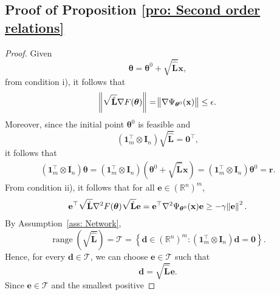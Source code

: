 \documentclass{siamart251216}
\begin{document}
\subsection{Proof of Proposition \ref{pro: Second order relations}}
\begin{proof}
    Given
    \[
        \boldsymbol{\theta}
        =
        \boldsymbol{\theta}^{0}
        +
        \sqrt{\hat{\mathbf{L}}}\mathbf{x},
    \]
    from condition i), it follows that
    \begin{gather*}
        \norm{
        \sqrt{\hat{\mathbf{L}}}
        \nabla F(\boldsymbol{\theta})
        }
        =
        \norm{
        \nabla
        \Psi_{\boldsymbol{\theta}^{0}}(\mathbf{x})
        }
        \le \epsilon.
    \end{gather*}
    Moreover, since the initial point
    $\boldsymbol{\theta}^{0}$ is feasible and
    \[
        (\bm{1}_{m}^{\top}\otimes\mathbf{I}_{n})
        \sqrt{\hat{\mathbf{L}}}
        =
        \bm{0}^{\top},
    \]
    it follows that
    \begin{gather*}
        (\bm{1}_{m}^{\top}\otimes\mathbf{I}_{n})
        \boldsymbol{\theta}
        =
        (\bm{1}_{m}^{\top}\otimes\mathbf{I}_{n})
        \left(
        \boldsymbol{\theta}^{0}
        +
        \sqrt{\hat{\mathbf{L}}}\mathbf{x}
        \right) =
        (\bm{1}_{m}^{\top}\otimes\mathbf{I}_{n})
        \boldsymbol{\theta}^{0}
        =
        \bm{r}.
    \end{gather*}
    From condition ii), it follows that for all
    $\mathbf{e}\in(\mathbb{R}^{n})^{m}$,
    \begin{gather*}
        \mathbf{e}^{\top}
        \sqrt{\hat{\mathbf{L}}}
        \nabla^{2}F(\boldsymbol{\theta})
        \sqrt{\hat{\mathbf{L}}}
        \mathbf{e}
        =
        \mathbf{e}^{\top}
        \nabla^{2}
        \Psi_{\boldsymbol{\theta}^{0}}(\mathbf{x})
        \mathbf{e}
        \ge
        -\gamma\norm{\mathbf{e}}^{2}.
    \end{gather*}
    By Assumption~\ref{ass: Network},
    \[
        \operatorname{range}
        \left(\sqrt{\hat{\mathbf{L}}}\right)
        =
        \mathcal{T}
        =
        \left\{
        \mathbf{d}\in(\mathbb{R}^{n})^{m}
        :
        (\bm{1}_{m}^{\top}\otimes\mathbf{I}_{n})
        \mathbf{d}
        =
        \bm{0}
        \right\}.
    \]
    Hence, for every $\mathbf{d}\in\mathcal{T}$, we can choose
    $\mathbf{e}\in\mathcal{T}$ such that
    \[
        \mathbf{d}
        =
        \sqrt{\hat{\mathbf{L}}}\mathbf{e}.
    \]
    Since $\mathbf{e}\in\mathcal{T}$ and the smallest positive

\end{proof}
\end{document}
